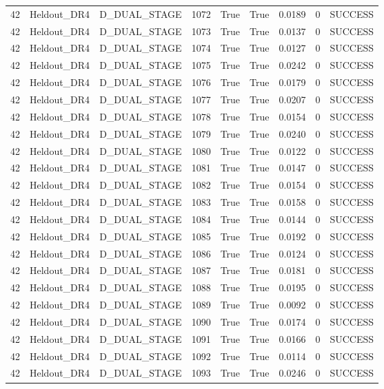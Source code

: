 \documentclass[11pt,a4paper,oneside]{book}
\begin{document}
\begin{longtable}{l l l l l l l l l}
42 & Heldout\_DR4 & D\_DUAL\_STAGE & 1072 & True & True & 0.0189 & 0 & SUCCESS \\
42 & Heldout\_DR4 & D\_DUAL\_STAGE & 1073 & True & True & 0.0137 & 0 & SUCCESS \\
42 & Heldout\_DR4 & D\_DUAL\_STAGE & 1074 & True & True & 0.0127 & 0 & SUCCESS \\
42 & Heldout\_DR4 & D\_DUAL\_STAGE & 1075 & True & True & 0.0242 & 0 & SUCCESS \\
42 & Heldout\_DR4 & D\_DUAL\_STAGE & 1076 & True & True & 0.0179 & 0 & SUCCESS \\
42 & Heldout\_DR4 & D\_DUAL\_STAGE & 1077 & True & True & 0.0207 & 0 & SUCCESS \\
42 & Heldout\_DR4 & D\_DUAL\_STAGE & 1078 & True & True & 0.0154 & 0 & SUCCESS \\
42 & Heldout\_DR4 & D\_DUAL\_STAGE & 1079 & True & True & 0.0240 & 0 & SUCCESS \\
42 & Heldout\_DR4 & D\_DUAL\_STAGE & 1080 & True & True & 0.0122 & 0 & SUCCESS \\
42 & Heldout\_DR4 & D\_DUAL\_STAGE & 1081 & True & True & 0.0147 & 0 & SUCCESS \\
42 & Heldout\_DR4 & D\_DUAL\_STAGE & 1082 & True & True & 0.0154 & 0 & SUCCESS \\
42 & Heldout\_DR4 & D\_DUAL\_STAGE & 1083 & True & True & 0.0158 & 0 & SUCCESS \\
42 & Heldout\_DR4 & D\_DUAL\_STAGE & 1084 & True & True & 0.0144 & 0 & SUCCESS \\
42 & Heldout\_DR4 & D\_DUAL\_STAGE & 1085 & True & True & 0.0192 & 0 & SUCCESS \\
42 & Heldout\_DR4 & D\_DUAL\_STAGE & 1086 & True & True & 0.0124 & 0 & SUCCESS \\
42 & Heldout\_DR4 & D\_DUAL\_STAGE & 1087 & True & True & 0.0181 & 0 & SUCCESS \\
42 & Heldout\_DR4 & D\_DUAL\_STAGE & 1088 & True & True & 0.0195 & 0 & SUCCESS \\
42 & Heldout\_DR4 & D\_DUAL\_STAGE & 1089 & True & True & 0.0092 & 0 & SUCCESS \\
42 & Heldout\_DR4 & D\_DUAL\_STAGE & 1090 & True & True & 0.0174 & 0 & SUCCESS \\
42 & Heldout\_DR4 & D\_DUAL\_STAGE & 1091 & True & True & 0.0166 & 0 & SUCCESS \\
42 & Heldout\_DR4 & D\_DUAL\_STAGE & 1092 & True & True & 0.0114 & 0 & SUCCESS \\
42 & Heldout\_DR4 & D\_DUAL\_STAGE & 1093 & True & True & 0.0246 & 0 & SUCCESS \\

\end{longtable}
\end{document}
